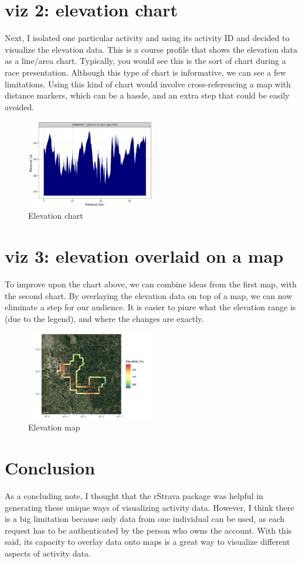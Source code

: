 \documentclass{article}
\begin{document}
\section{viz 2: elevation chart}
Next, I isolated one particular activity and using its activity ID and decided to visualize the elevation data. This is a course profile that shows the elevation data as a line/area chart. Typically, you would see this is the sort of chart during a race presentation. 
Although this type of chart is informative, we can see a few limitations. Using this kind of chart would involve cross-referencing a map with distance markers, which can be a hassle, and an extra step that could be easily avoided.
\begin{figure}[h]
\centering
\includegraphics[width=0.5\textwidth]{PS6b_Onishi.png}
\caption{Elevation chart}
\end{figure}

\section{viz 3: elevation overlaid on a map}
To improve upon the chart above, we can combine ideas from the first map, with the second chart. By overlaying the elevation data on top of a map, we can now eliminate a step for our audience. It is easier to piure what the elevation range is (due to the legend), and where the changes are exactly.
\begin{figure}[h]
\centering
\includegraphics[width=0.5\textwidth]{PS6c_Onishi.png}
\caption{Elevation map}
\end{figure}

\section{Conclusion}
As a concluding note, I thought that the rStrava package was helpful in generating these unique ways of visualizing activity data. However, I think there is a big limitation because only data from one individual can be used, as each request has to be authenticated by the person who owns the account.
With this said, its capacity to overlay data onto maps is a great way to visualize different aspects of activity data.
\end{document}

